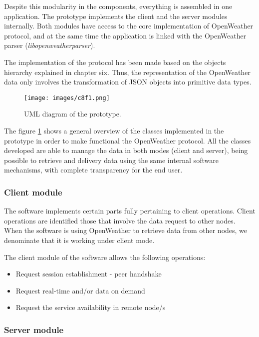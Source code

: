 Despite this modularity in the components, everything is assembled in one application.
The prototype implements the client and the server modules  internally. Both modules have access to the core implementation of OpenWeather protocol, and at the same time the application is linked with the OpenWeather parser (\emph{libopenweatherparser}). 

The implementation of the protocol has been made based on the objects hierarchy explained in chapter six. Thus, the representation of the OpenWeather data only involves the transformation of \gls{JSON} objects into primitive data types.

\begin{figure}[H]
\centerline{\texttt{[image: images/c8f1.png]}}
\caption{\protect \gls{UML} diagram of the prototype.}
\label{tuml}
\end{figure}

The figure \ref{tuml} shows a general overview of the classes implemented in the prototype in order to make functional the OpenWeather protocol. All the classes developed are able to manage the data in both modes (client and server), being possible to retrieve and delivery data using the same internal software mechanisms, with complete transparency for the end user.

\subsubsection{Client module}

The software implements certain parts fully pertaining to client operations. Client operations are identified those that involve the data request to other nodes. When the software is using OpenWeather to retrieve data from other nodes, we denominate that it is working under client mode.

The client module of the software allows the following operations:

\begin{itemize}
\item Request session establishment - peer handshake
\item Request real-time and/or data on demand
\item Request the service availability in remote node/s
\end{itemize}

\subsubsection{Server module}

